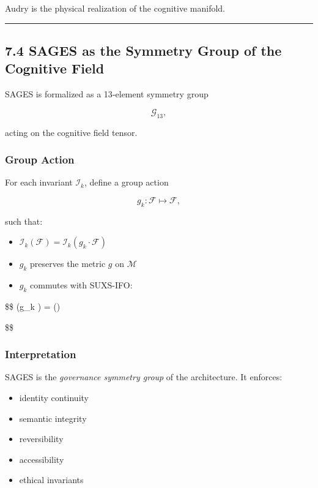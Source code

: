 Audry is the physical realization of the cognitive manifold.

\begin{center}\rule{0.5\linewidth}{0.5pt}\end{center}

\subsection{7.4 SAGES as the Symmetry Group of the Cognitive Field}\label{sages-as-the-symmetry-group-of-the-cognitive-field}

SAGES is formalized as a 13‑element symmetry group

\[
\mathcal{G}_{13},
\]

acting on the cognitive field tensor.

\subsubsection{Group Action}\label{group-action}

For each invariant \(\mathcal{I}_k\), define a group action

\[
g_k : \mathcal{F} \mapsto \mathcal{F},
\]

such that:

\begin{itemize}
\tightlist
\item
  \(\mathcal{I}_k(\mathcal{F}) = \mathcal{I}_k(g_k \cdot \mathcal{F})\)\\
\item
  \(g_k\) preserves the metric \(g\) on \(\mathcal{M}\)\\
\item
  \(g_k\) commutes with SUXS-IFO:
\end{itemize}

\$\$ (g\_k \cdot {}) = ()

\$\$

\subsubsection{Interpretation}\label{interpretation-3}

SAGES is the \emph{governance symmetry group} of the architecture. It enforces:

\begin{itemize}
\tightlist
\item
  identity continuity\\
\item
  semantic integrity\\
\item
  reversibility\\
\item
  accessibility\\
\item
  ethical invariants
\end{itemize}

